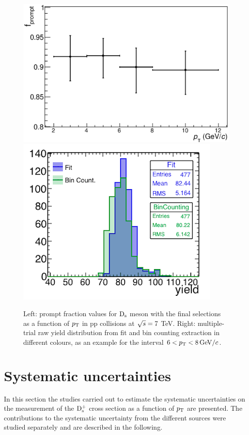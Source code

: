 \begin{figure}[!t]
\begin{center}
\includegraphics[width=.49\textwidth]{FigCap4/promptFraction_pass4.eps}
 \includegraphics[width=.47\textwidth]{FigCap4/MT_pt68.png}
\caption{Left: prompt fraction values for ${\rm D_s}$ meson with the final selections as a function of $p_{\rm T}$ in pp collisions at $\sqrt{s} = 7$ TeV. Right: multiple-trial raw yield distribution from fit and bin counting extraction in different colours, as an example for the interval \mbox{$6 < p_{\rm T} < 8 \, \mathrm{GeV}/c$}.}
\label{fig:fpromptAndMT}
\end{center}
\end{figure}



\section{Systematic uncertainties}
\label{sec:systPP}
In this section the studies carried out to estimate the systematic uncertainties on the
 measurement of the ${\rm D_s^+}$ cross section as a function of $p_{\rm T}$ are presented. 
 The contributions to the systematic uncertainty from the different 
 sources were studied separately and are described in the following.

